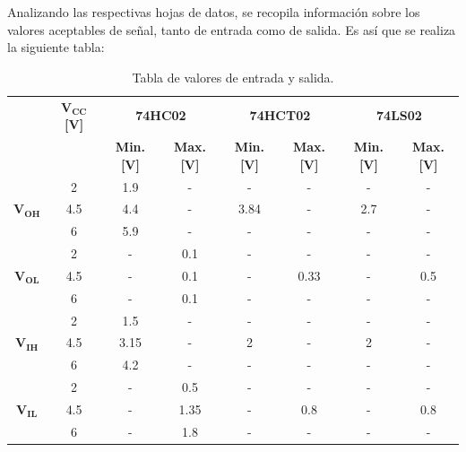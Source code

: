 Analizando las respectivas hojas de datos, se recopila información sobre los  valores aceptables de señal, tanto de entrada como de salida. Es así que se realiza la siguiente tabla:
\begin{table}[H]
\centering
\begin{tabular}{c|c|c|c|c|c|c|c|}
\cline{2-8}
                               & $\mathbf{V_{CC}}$ \textbf{[V]} & \multicolumn{2}{c|}{\textbf{74HC02}}  & \multicolumn{2}{c|}{\textbf{74HCT02}} & \multicolumn{2}{c|}{\textbf{74LS02}} \\ \cline{3-8} 
                               &              & \textbf{Min. [V]} & \textbf{Max. [V]} & \textbf{Min. [V]} & \textbf{Max. [V]} & \textbf{Min. [V]} & \textbf{Max. [V]}	\\ \hline
\multicolumn{1}{|c|}{}         & 2            & 1.9           & -            & -             & -            & -          & -            \\  
\multicolumn{1}{|c|}{$\mathbf{V_{OH}}$} & 4.5          & 4.4           & -            & 3.84          & -            & 2.7            & -            \\  
\multicolumn{1}{|c|}{}         & 6            & 5.9           & -            & -             & -            & -            & -            \\ \hline
\multicolumn{1}{|c|}{}         & 2            & -             & 0.1          & -             & -            & -            & -          \\
\multicolumn{1}{|c|}{$\mathbf{V_{OL}}$} & 4.5          & -             & 0.1          & -             & 0.33         & -            & 0.5            \\
\multicolumn{1}{|c|}{}         & 6            & -             & 0.1          & -             & -            & -            & -            \\ \hline
\multicolumn{1}{|c|}{}         & 2            & 1.5           & -            & -             & -            & -            & -            \\ 
\multicolumn{1}{|c|}{$\mathbf{V_{IH}}$}  & 4.5          & 3.15          & -            & 2             & -            & 2            & -            \\ 
\multicolumn{1}{|c|}{}         & 6            & 4.2           & -            & -             & -            & -            & -            \\ \hline
\multicolumn{1}{|c|}{}         & 2            & -             & 0.5          & -             & -            & -            & -            \\ 
\multicolumn{1}{|c|}{$\mathbf{V_{IL}}$} & 4.5          & -             & 1.35         & -             & 0.8          & -            & 0.8          \\ 
\multicolumn{1}{|c|}{}         & 6            & -             & 1.8          & -             & -            & -            & -            \\ \hline
\end{tabular}
\centering
\caption{Tabla de valores de entrada y salida.}
\label{tabla:vinout}
\end{table}

